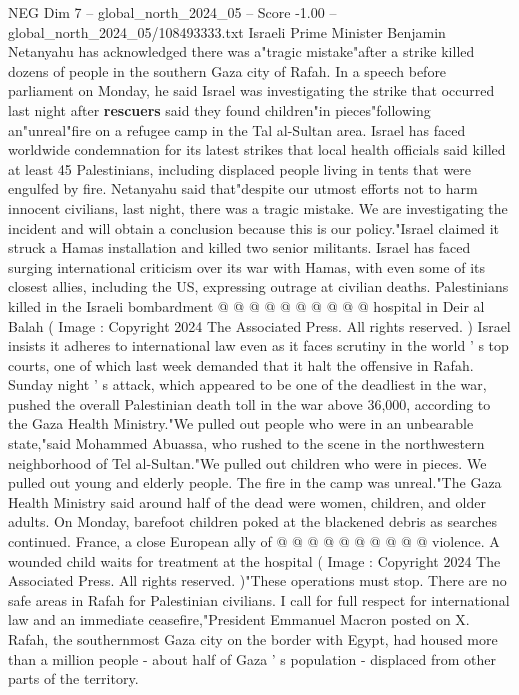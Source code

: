 \begin{textsample}{NEG Dim 7 – global\_north\_2024\_05 – Score -1.00 – global\_north\_2024\_05/108493333.txt}  \label{ex:f7_neg_396}
Israeli Prime Minister Benjamin Netanyahu has acknowledged there was a"tragic mistake"after a strike killed dozens of people in the southern Gaza city of Rafah.
In a speech before parliament on Monday, he said Israel was investigating the strike that occurred last night after \textbf{rescuers} said they found children"in pieces"following an"unreal"fire on a refugee camp in the Tal al-Sultan area.
Israel has faced worldwide condemnation for its latest strikes that local health officials said killed at least 45 Palestinians, including displaced people living in tents that were engulfed by fire.
Netanyahu said that"despite our utmost efforts not to harm innocent civilians, last night, there was a tragic mistake.
We are investigating the incident and will obtain a conclusion because this is our policy."Israel claimed it struck a Hamas installation and killed two senior militants.
Israel has faced surging international criticism over its war with Hamas, with even some of its closest allies, including the US, expressing outrage at civilian deaths.
Palestinians killed in the Israeli bombardment @ @ @ @ @ @ @ @ @ @ hospital in Deir al Balah ( Image : Copyright 2024 The Associated Press.
All rights reserved. ) Israel insists it adheres to international law even as it faces scrutiny in the world ' s top courts, one of which last week demanded that it halt the offensive in Rafah.
Sunday night ' s attack, which appeared to be one of the deadliest in the war, pushed the overall Palestinian death toll in the war above 36,000, according to the Gaza Health Ministry."We pulled out people who were in an unbearable state,"said Mohammed Abuassa, who rushed to the scene in the northwestern neighborhood of Tel al-Sultan."We pulled out children who were in pieces.
We pulled out young and elderly people.
The fire in the camp was unreal."The Gaza Health Ministry said around half of the dead were women, children, and older adults.
On Monday, barefoot children poked at the blackened debris as searches continued.
France, a close European ally of @ @ @ @ @ @ @ @ @ @ violence.
A wounded child waits for treatment at the hospital ( Image : Copyright 2024 The Associated Press.
All rights reserved. )"These operations must stop.
There are no safe areas in Rafah for Palestinian civilians.
I call for full respect for international law and an immediate ceasefire,"President Emmanuel Macron posted on X.
Rafah, the southernmost Gaza city on the border with Egypt, had housed more than a million people - about half of Gaza ' s population - displaced from other parts of the territory.

\end{textsample}
